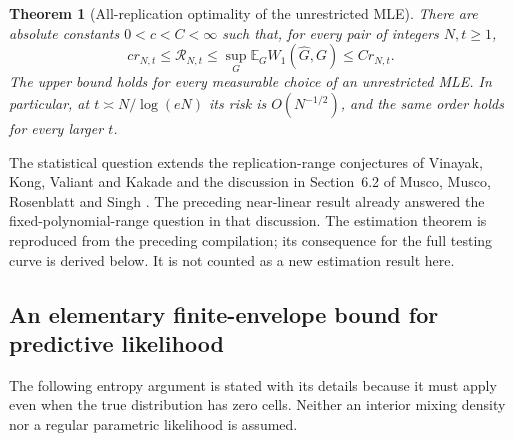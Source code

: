 \documentclass[11pt,a4paper]{article}
\newtheorem{theorem}{Theorem}[section]
\theoremstyle{definition}
\theoremstyle{remark}
\numberwithin{equation}{section}
\begin{document}
\begin{theorem}[All-replication optimality of the unrestricted MLE]
\label{p8:p06:bm:full}
There are absolute constants $0<c<C<\infty$ such that, for every pair of
integers $N,t\ge1$,
\begin{equation}\label{p8:p06:bm:fullrate}
 c r_{N,t}\le \mathcal R_{N,t}
 \le \sup_G\mathbb E_G W_1(\widehat G,G)
 \le C r_{N,t}.
\end{equation}
The upper bound holds for every measurable choice of an unrestricted MLE.
In particular, at $t\asymp N/\log(eN)$ its risk is $O(N^{-1/2})$,
and the same order holds for every larger $t$.
\end{theorem}

The statistical question extends the replication-range conjectures of
Vinayak, Kong, Valiant and Kakade \cite{p8:BT_VKVK2019} and the discussion
in Section~6.2 of Musco, Musco, Rosenblatt and Singh
\cite{p8:BT_MMRS2025}. The preceding near-linear result already answered the
fixed-polynomial-range question in that discussion. The estimation theorem is reproduced from the preceding compilation;
its consequence for the full testing curve is derived below. It is not
counted as a new estimation result here.

\subsection{An elementary finite-envelope bound for predictive likelihood}

The following entropy argument is stated with its details because it
must apply even when the true distribution has zero cells. Neither an
interior mixing density nor a regular parametric likelihood is assumed.
\end{document}
